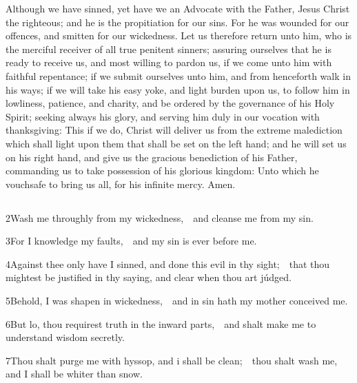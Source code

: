 {Although we have sinned, yet have we an Advocate with the Father, Jesus Christ the righteous; and he is the propitiation for our sins. For he was wounded for our offences, and smitten for our wickedness. Let us therefore return unto him, who is the merciful receiver of all true penitent sinners; assuring ourselves that he is ready to receive us, and most willing to pardon us, if we come unto him with faithful repentance; if we submit ourselves unto him, and from henceforth walk in his ways; if we will take his easy yoke, and light burden upon us, to follow him in lowliness, patience, and charity, and be ordered by the governance of his Holy Spirit; seeking always his glory, and serving him duly in our vocation with thanksgiving: This if we do, Christ will deliver us from %
the extreme malediction which shall light upon them that shall be set on the left hand; and he will set us on his right hand, and give us the gracious benediction of his Father, commanding us to take possession of his glorious kingdom: Unto which he vouchsafe to bring us all, for his infinite mercy. Amen.}


\medskip


\subsection{}

2\enspace Wash me throughly from my wickedness,\ \star\ and cleanse me from my sin.

3\enspace For I knowledge my faults,\ \star\ and my sin is ever before me.

4\enspace Against thee only have I sinned, and done this evil in thy sight;\ \star\ that thou mightest be justified in thy saying, and clear when thou art júdged.

5\enspace Behold, I was shapen in wickedness,\ \star\ and in sin hath my mother conceived me.

6\enspace But lo, thou requirest truth in the inward parts,\ \star\ and shalt make me to understand wisdom secretly.

7\enspace Thou shalt purge me with hyssop, and i shall be clean;\ \star\ thou shalt wash me, and I shall be whiter than snow.

